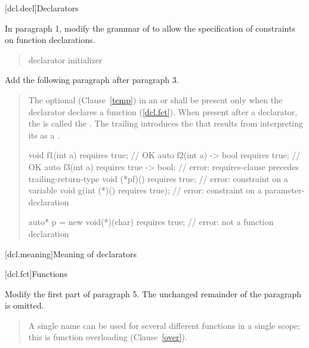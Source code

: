\setcounter{chapter}{10}
[dcl.decl]{Declarators}

In paragraph 1, modify the grammar of  to
allow the specification of constraints on function declarations.

\begin{quote}
\pnum
\begin{bnf}
\br
    declarator initializer\opt\br
\end{bnf}
\end{quote}

Add the following paragraph after paragraph 3.

\setcounter{Paras}{2}
\begin{quote}
\begin{addedblock}
\pnum
The optional  (Clause~\ref{temp}) in an
 or 
shall be present only when the declarator declares a 
function (\ref{dcl.fct}).
% 
When present after a declarator, the  
is called the .
The trailing  introduces the
 that results from interpreting
its  as a
.
% 
\enterexample
\begin{codeblock}
void f1(int a) requires true;         // OK
auto f2(int a) -> bool requires true; // OK
auto f3(int a) requires true -> bool; // error: requires-clause precedes trailing-return-type
void (*pf)() requires true;           // error: constraint on a variable
void g(int (*)() requires true);      // error: constraint on a parameter-declaration
  
auto* p = new void(*)(char) requires true; // error: not a function declaration
\end{codeblock}
\exitexample
\end{addedblock}
\end{quote}


\setcounter{section}{2}
[dcl.meaning]{Meaning of declarators}


\setcounter{subsection}{4}
[dcl.fct]{Functions}

Modify the first part of paragraph 5. The unchanged remainder of the paragraph
is omitted.

\begin{quote}
\setcounter{Paras}{4}
\pnum
A single name can be used for several different functions in a single 
scope; this is function overloading (Clause~\ref{over}). 
%
\end{quote}

